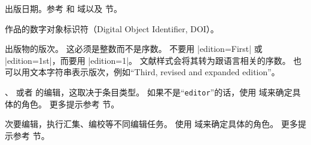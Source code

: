 \begin{fieldlist}

出版日期。参考  和  域以及  节。




作品的数字对象标识符（Digital Object Identifier,  DOI）。




出版物的版次。
这必须是整数而不是序数。
不要用 |edition={First}| 或 |edition={1st}|，而要用 |edition={1}|。
文献样式会将其转为跟语言相关的序数。
也可以用文本字符串表示版次，例如“Third, revised and expanded edition”。




、 或者  的编辑，这取决于条目类型。
如果不是“\texttt{editor}”的话，使用  域来确定具体的角色。
更多提示参考  节。




次要编辑，执行汇集、编校等不同编辑任务。
使用  域来确定具体的角色。
更多提示参考  节。




\end{fieldlist}
